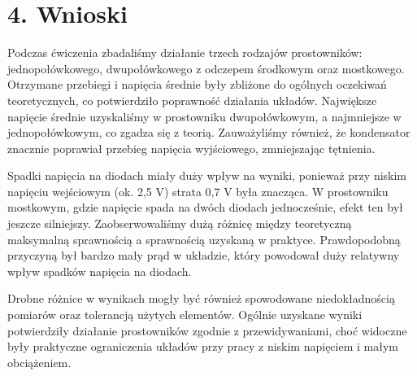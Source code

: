 \documentclass[a4paper,12pt]{article}
\begin{document}
\section*{4. Wnioski}

Podczas ćwiczenia zbadaliśmy działanie trzech rodzajów prostowników: jednopołówkowego, dwupołówkowego z odczepem środkowym oraz mostkowego. Otrzymane przebiegi i napięcia średnie były zbliżone do ogólnych oczekiwań teoretycznych, co potwierdziło poprawność działania układów. Największe napięcie średnie uzyskaliśmy w prostowniku dwupołówkowym, a najmniejsze w jednopołówkowym, co zgadza się z teorią. Zauważyliśmy również, że kondensator znacznie poprawiał przebieg napięcia wyjściowego, zmniejszając tętnienia.

Spadki napięcia na diodach miały duży wpływ na wyniki, ponieważ przy niskim napięciu wejściowym (ok. 2,5 V) strata 0,7 V była znacząca. W prostowniku mostkowym, gdzie napięcie spada na dwóch diodach jednocześnie, efekt ten był jeszcze silniejszy. Zaobserwowaliśmy dużą różnicę między teoretyczną maksymalną sprawnością a sprawnością uzyskaną w praktyce. Prawdopodobną przyczyną był bardzo mały prąd w układzie, który powodował duży relatywny wpływ spadków napięcia na diodach.

Drobne różnice w wynikach mogły być również spowodowane niedokładnością pomiarów oraz tolerancją użytych elementów. Ogólnie uzyskane wyniki potwierdziły działanie prostowników zgodnie z przewidywaniami, choć widoczne były praktyczne ograniczenia układów przy pracy z niskim napięciem i małym obciążeniem.
\end{document}
